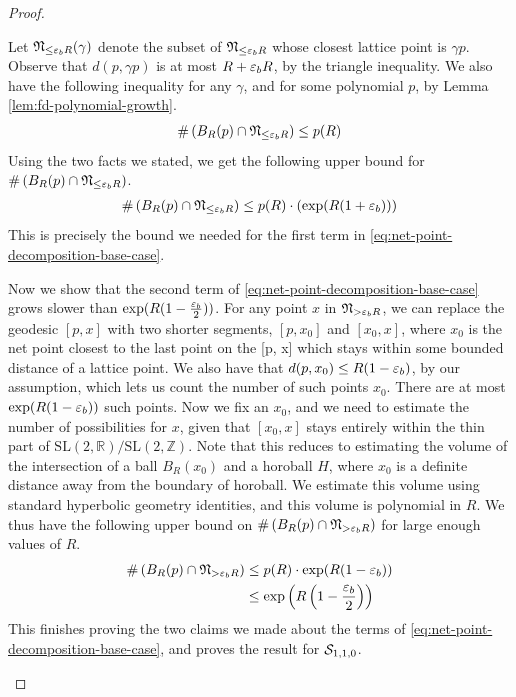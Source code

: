 \documentclass[12pt, reqno]{amsart}
\begin{document}
\begin{proof}
\begin{itemize}
    Let $\mathfrak{N}_{\leq \varepsilon_b R}(\gamma)$ denote the subset of $\mathfrak{N}_{\leq \varepsilon_b R}$ whose closest lattice point is $\gamma p$.
    Observe that $d(p, \gamma p)$ is at most $R + \varepsilon_b R$, by the triangle inequality.
    We also have the following inequality for any $\gamma$, and for some polynomial $p$, by Lemma \ref{lem:fd-polynomial-growth}.
    \begin{align*}
      \#\left( B_R(p) \cap \mathfrak{N}_{\leq \varepsilon_b R} \right) \leq p(R)
    \end{align*}
    Using the two facts we stated, we get the following upper bound for $\#\left( B_R(p) \cap \mathfrak{N}_{\leq \varepsilon_b R} \right)$.
    \begin{align*}
      \#\left( B_R(p) \cap \mathfrak{N}_{\leq \varepsilon_b R} \right) \leq p(R) \cdot \left( \exp(R(1+\varepsilon_b)) \right)
    \end{align*}
    This is precisely the bound we needed for the first term in \eqref{eq:net-point-decomposition-base-case}.

    Now we show that the second term of \eqref{eq:net-point-decomposition-base-case} grows slower than $\exp(R(1- \frac{ \varepsilon_b}{2}))$.
    For any point $x$ in $\mathfrak{N}_{> \varepsilon_b R}$, we can replace the geodesic $[p, x]$ with two shorter segments, $[p, x_0]$ and $[x_0, x]$, where $x_0$ is the net point closest to the last point on the [p, x] which stays within some bounded distance of a lattice point.
    We also have that $d(p, x_0) \leq R(1-\varepsilon_b)$, by our assumption, which lets us count the number of such points $x_0$.
    There are at most $\exp(R(1-\varepsilon_b))$ such points.
    Now we fix an $x_0$, and we need to estimate the number of possibilities for $x$, given that $[x_0, x]$ stays entirely within the thin part of $\mathrm{SL}(2, \mathbb{R})/\mathrm{SL}(2, \mathbb{Z})$.
    Note that this reduces to estimating the volume of the intersection of a ball $B_R(x_0)$ and a horoball $H$, where $x_0$ is a definite distance away from the boundary of horoball.
    We estimate this volume using standard hyperbolic geometry identities, and this volume is polynomial in $R$.
    We thus have the following upper bound on $\#\left( B_R(p) \cap \mathfrak{N}_{> \varepsilon_b R} \right) $ for large enough values of $R$.
    \begin{align*}
      \#\left( B_R(p) \cap \mathfrak{N}_{> \varepsilon_b R} \right)  &\leq p(R) \cdot \exp(R(1-\varepsilon_b)) \\
                                                        &\leq \exp\left(R\left(1 - \frac{\varepsilon_b}{2}\right)\right)
    \end{align*}
    This finishes proving the two claims we made about the terms of \eqref{eq:net-point-decomposition-base-case}, and proves the result for $\mathcal{S}_{1,1,0}$.


\end{itemize}
\end{proof}
\end{document}
